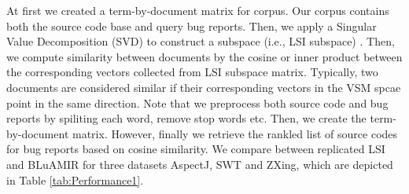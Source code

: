 \documentclass[conference]{IEEEtran}
\begin{document}
At first we created a term-by-document matrix for corpus. Our corpus contains both the source code base and query bug reports. Then, we apply a Singular Value Decomposition (SVD) to construct a subspace (i.e., LSI subspace) \cite{SaltonMIR}. 
Then, we compute similarity between documents by the cosine or inner product between the corresponding vectors collected from LSI subspace matrix. Typically, two documents are considered similar if their corresponding vectors in the VSM spcae point in the same direction.
Note that we preprocess both source code and bug reports by spiliting each word, remove stop words etc. Then, we create the term-by-document matrix. However, finally we retrieve the rankled list of source codes for bug reports based on cosine similarity. We compare between replicated LSI and BLuAMIR for three datasets AspectJ, SWT and ZXing, which are depicted in Table \ref{tab:Performance1}.
\end{document}
